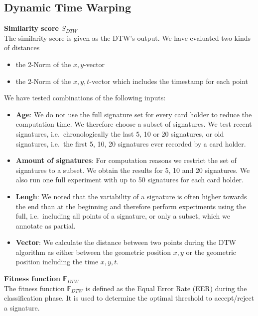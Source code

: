 \documentclass[a4paper, oneside]{csthesis}
\begin{document}

\subsection{Dynamic Time Warping}

\noindent\textbf{Similarity score $S_{DTW}$}\\
The similarity score is given as the DTW's output.
We have evaluated two kinds of distances
\begin{itemize}
\item the 2-Norm of the $x,y$-vector
\item the 2-Norm of the $x,y,t$-vector which includes the timestamp for each point
\end{itemize}

We have tested combinations of the following inputs:
\begin{itemize}
\item \textbf{Age}: We do not use the full signature set for every card holder to reduce the computation time. We therefore choose a subset of signatures. We test recent signatures, i.e.\ chronologically the last 5, 10 or 20 signatures, or old signatures, i.e.\ the first 5, 10, 20 signatures ever recorded by a card holder.
\item \textbf{Amount of signatures}: For computation reasons we restrict the set of signatures to a subset. We obtain the results for 5, 10 and 20 signatures. We also run one full experiment with up to 50 signatures for each card holder.
\item \textbf{Lengh}: We noted that the variability of a signature is often higher towards the end than at the beginning and therefore perform experiments using the full, i.e.\ including all points of a signature, or only a subset, which we annotate as partial.
\item \textbf{Vector}: We calculate the distance between two points during the DTW algorithm as either between the geometric position $x,y$ or the geometric position including the time $x,y,t$.
\end{itemize}

\noindent\textbf{Fitness function $\mathbb{F}_{DTW}$}\\

The fitness function $\mathbb{F}_{DTW}$ is defined as the Equal Error Rate (EER) during the classification phase. It is used to determine the optimal threshold to accept/reject a signature.
\end{document}
